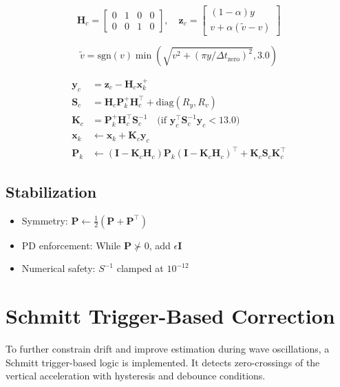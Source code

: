 \documentclass[11pt,letterpaper]{article}
\begin{document}
\begin{equation}
\bm{H}_c = \begin{bmatrix}0&1&0&0\\0&0&1&0\end{bmatrix}, \quad
\bm{z}_c = \begin{bmatrix}(1-\alpha)y\\v+\alpha(\tilde{v}-v)\end{bmatrix}
\end{equation}

\begin{equation}
\tilde{v} = \mathrm{sgn}(v)\min\left(\sqrt{v^2 + (\pi y/\Delta t_\mathrm{zero})^2}, 3.0\right)
\end{equation}

\begin{align}
\bm{y}_c &= \bm{z}_c - \bm{H}_c\bm{x}_k^+ \\
\bm{S}_c &= \bm{H}_c\bm{P}_k^+\bm{H}_c^\top + \mathrm{diag}(R_y, R_v) \\
\bm{K}_c &= \bm{P}_k^+\bm{H}_c^\top \bm{S}_c^{-1} \quad \text{(if $\bm{y}_c^\top\bm{S}_c^{-1}\bm{y}_c < 13.0$)} \\
\bm{x}_k &\leftarrow \bm{x}_k + \bm{K}_c\bm{y}_c \\
\bm{P}_k &\leftarrow (\bm{I}-\bm{K}_c\bm{H}_c)\bm{P}_k(\bm{I}-\bm{K}_c\bm{H}_c)^\top + \bm{K}_c\bm{S}_c\bm{K}_c^\top
\end{align}

\subsection{Stabilization}
\begin{itemize}
\item Symmetry: $\bm{P} \leftarrow \frac{1}{2}(\bm{P}+\bm{P}^\top)$
\item PD enforcement: While $\bm{P} \not\succ 0$, add $\epsilon\bm{I}$
\item Numerical safety: $S^{-1}$ clamped at $10^{-12}$
\end{itemize}


\section{Schmitt Trigger-Based Correction}
To further constrain drift and improve estimation during wave oscillations, a Schmitt trigger-based logic is implemented. It detects zero-crossings of the vertical acceleration with hysteresis and debounce conditions.
\end{document}
